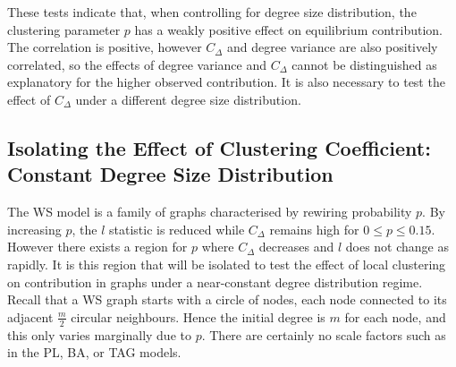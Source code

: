 
These tests indicate that, when controlling for degree size distribution, the clustering parameter $p$ has a weakly positive effect on equilibrium contribution. The correlation is positive, however $C_\Delta$ and degree variance are also positively correlated, so the effects of degree variance and $C_\Delta$ cannot be distinguished as explanatory for the higher observed contribution. It is also necessary to test the effect of $C_\Delta$ under a different degree size distribution. 


\subsection{Isolating the Effect of Clustering Coefficient: Constant Degree Size Distribution}
The WS model is a family of graphs characterised by rewiring probability $p$. By increasing $p$, the $l$ statistic is reduced while $C_\Delta$ remains high for $0\leq p\leq0.15$. However there exists a region for $p$ where $C_\Delta$ decreases and $l$ does not change as rapidly. It is this region that will be isolated to test the effect of local clustering on contribution in graphs under a near-constant degree distribution regime. Recall that a WS graph starts with a circle of nodes, each node connected to its adjacent $\frac{m}{2}$ circular neighbours. Hence the initial degree is $m$ for each node, and this only varies marginally due to $p$. There are certainly no scale factors such as in the PL, BA, or TAG models. \\

